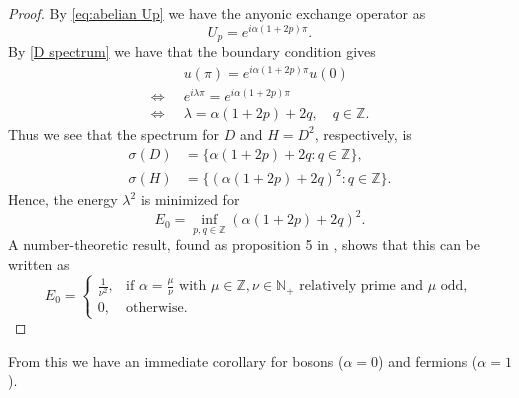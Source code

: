 \begin{proof}
  By \cref{eq:abelian Up} we have the anyonic exchange operator as
  \begin{equation}
    U_p = e^{iα(1+2p)π}.
  \end{equation}
  By \cref{D spectrum} we have that the boundary condition gives
  \begin{equation}
    \begin{aligned}
      &u(π) = e^{iα(1+2p)π} u(0) \\
      \iff\;\; &e^{iλ π} = e^{iα(1+2p)π} \\
      \iff\;\; &λ = α(1+2p) + 2q, \quad q ∈ ℤ.
    \end{aligned}
  \end{equation}
  Thus we see that the spectrum for $D$ and $H = D^2$, respectively, is
  \begin{equation}
    \begin{aligned}
      σ(D) &= \{ α(1+2p) + 2q : q ∈ ℤ\}, \\
      σ(H) &= \{ (α(1+2p) + 2q)^2 : q ∈ ℤ\}.
    \end{aligned}
  \end{equation}
  Hence, the energy $λ^2$ is minimized for
  \begin{equation}
    E_0 = \inf_{p,q∈ℤ} (α(1+2p)+2q)^2.
  \end{equation}
  A number-theoretic result, found as proposition 5 in \cite{lundholm-solovej}, shows that this can be written as
  \begin{equation}
    E_0 =
    \begin{cases}
      \frac{1}{ν^2}, & \text{if $α = \frac{μ}{ν}$ with $μ ∈ ℤ, ν ∈ ℕ_+$ relatively prime and $μ$ odd}, \\
      0, & \text{otherwise}.
    \end{cases}
  \end{equation}
\end{proof}

From this we have an immediate corollary for bosons ($α = 0$) and fermions ($α = 1$).

